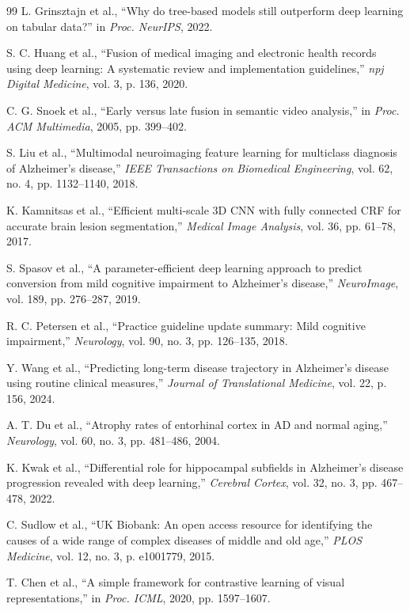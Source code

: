 \documentclass[conference]{IEEEtran}
\begin{document}
\begin{thebibliography}{99}
L. Grinsztajn et al., ``Why do tree-based models still outperform deep learning on tabular data?'' in \textit{Proc. NeurIPS}, 2022.

S. C. Huang et al., ``Fusion of medical imaging and electronic health records using deep learning: A systematic review and implementation guidelines,'' \textit{npj Digital Medicine}, vol. 3, p. 136, 2020.

C. G. Snoek et al., ``Early versus late fusion in semantic video analysis,'' in \textit{Proc. ACM Multimedia}, 2005, pp. 399--402.

S. Liu et al., ``Multimodal neuroimaging feature learning for multiclass diagnosis of Alzheimer's disease,'' \textit{IEEE Transactions on Biomedical Engineering}, vol. 62, no. 4, pp. 1132--1140, 2018.

K. Kamnitsas et al., ``Efficient multi-scale 3D CNN with fully connected CRF for accurate brain lesion segmentation,'' \textit{Medical Image Analysis}, vol. 36, pp. 61--78, 2017.

S. Spasov et al., ``A parameter-efficient deep learning approach to predict conversion from mild cognitive impairment to Alzheimer's disease,'' \textit{NeuroImage}, vol. 189, pp. 276--287, 2019.

R. C. Petersen et al., ``Practice guideline update summary: Mild cognitive impairment,'' \textit{Neurology}, vol. 90, no. 3, pp. 126--135, 2018.

Y. Wang et al., ``Predicting long-term disease trajectory in Alzheimer's disease using routine clinical measures,'' \textit{Journal of Translational Medicine}, vol. 22, p. 156, 2024.

A. T. Du et al., ``Atrophy rates of entorhinal cortex in AD and normal aging,'' \textit{Neurology}, vol. 60, no. 3, pp. 481--486, 2004.

K. Kwak et al., ``Differential role for hippocampal subfields in Alzheimer's disease progression revealed with deep learning,'' \textit{Cerebral Cortex}, vol. 32, no. 3, pp. 467--478, 2022.

C. Sudlow et al., ``UK Biobank: An open access resource for identifying the causes of a wide range of complex diseases of middle and old age,'' \textit{PLOS Medicine}, vol. 12, no. 3, p. e1001779, 2015.

T. Chen et al., ``A simple framework for contrastive learning of visual representations,'' in \textit{Proc. ICML}, 2020, pp. 1597--1607.


\end{thebibliography}
\end{document}
